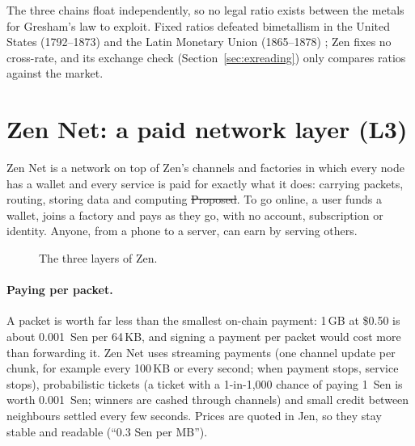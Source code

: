 The three chains float independently, so no legal ratio exists between the metals for Gresham's law to exploit. Fixed ratios defeated bimetallism in the United States (1792--1873) and the Latin Monetary Union (1865--1878) \cite{velde}; Zen fixes no cross-rate, and its exchange check (Section~\ref{sec:exreading}) only compares ratios against the market.

\section{Zen Net: a paid network layer (L3)}\label{sec:zennet}

Zen Net is a network on top of Zen's channels and factories in which every node has a wallet and every service is paid for exactly what it does: carrying packets, routing, storing data and computing \st{Proposed}. To go online, a user funds a wallet, joins a factory and pays as they go, with no account, subscription or identity. Anyone, from a phone to a server, can earn by serving others.

\begin{figure}[htbp]
\centering
{}
\caption{The three layers of Zen.}
\label{fig:layers}
\end{figure}

\paragraph{Paying per packet.} A packet is worth far less than the smallest on-chain payment: 1\,GB at \$0.50 is about 0.001~Sen per 64\,KB, and signing a payment per packet would cost more than forwarding it. Zen Net uses streaming payments (one channel update per chunk, for example every 100\,KB or every second; when payment stops, service stops), probabilistic tickets (a ticket with a 1-in-1,000 chance of paying 1~Sen is worth 0.001~Sen; winners are cashed through channels) and small credit between neighbours settled every few seconds. Prices are quoted in Jen, so they stay stable and readable (``0.3 Sen per MB'').

